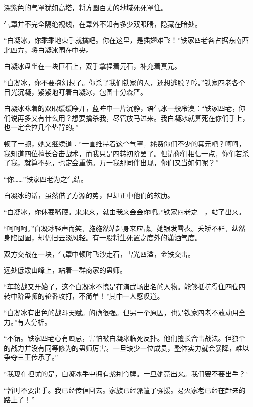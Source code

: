 
\begin{this_body}

深紫色的气罩犹如高塔，将方圆百丈的地域死死罩住。

气罩并不完全隔绝视线，在罩外不知有多少双眼睛，隐藏在暗处。

“白凝冰，你乖乖地束手就擒吧。你在这里，是插翅难飞！”铁家四老各占据东南西北四方，将白凝冰围在中央。

白凝冰盘坐在一块巨石上，双手拿捏着元石，补充着真元。

“白凝冰，你不要抱幻想了。你杀了我们铁家的人，还想逃脱？哼。”铁家四老各个目光沉凝，紧紧地盯着白凝冰，包围十分森严。

白凝冰眯着的双眼缓缓睁开，蓝眸中一片沉静，语气冰一般冷漠：“铁家四老，你们说再多又有什么用？想要擒杀我，尽管放马过来。我白凝冰就算死在你们手上，也一定会拉几个垫背的。”

顿了一顿，她又继续道：“一直维持着这个气罩，耗费你们不少的真元吧？呵呵，我知道四位擅长合击战术，而我只是四转初阶罢了。但请你们相信一点，你们若杀了我，就算不死，也定会重伤。万一我那同伴出现，你们又当如何呢？”

“你……”铁家四老为之气结。

白凝冰的话，虽然借了方源的势，但却正中他们的软肋。

“白凝冰，你休要嘴硬。来来来，就由我来会会你吧。”铁家四老之一，站了出来。

“呵呵呵。”白凝冰轻声而笑，施施然站起身来应战。她银发雪衣。夭矫不群，纵然身陷囹圄，却仍旧云淡风轻。有一股将生死置之度外的潇洒气度。

双方交战在一块，气罩中顿时飞沙走石，雪光四溢，金铁交击。

远处低矮山峰上，站着一群商家的蛊师。

“车轮战又开始了，这个白凝冰不愧是在演武场出名的人物。能够抵抗得住四位四转中阶蛊师的轮番攻打，不简单！”其中一人感叹道。

“白凝冰有出色的战斗天赋。的确很强。但另一个原因，也是铁家四老不敢动用全力。”有人分析。

“不错。铁家四老心有顾忌，害怕被白凝冰临死反扑。他们擅长合击战法。但独个的战力并没有同等修为的蛊师厉害。一旦缺少一位成员，整体实力就会暴降，难以争夺三王传承了。”

“我现在担忧的是，白凝冰手中拥有紫荆令牌。一旦她亮出来。我们要不要出手？”

“暂时不要出手。我已经传信回去。家族已经派遣了强援。易火家老已经在赶来的路上了！”


\end{this_body}
